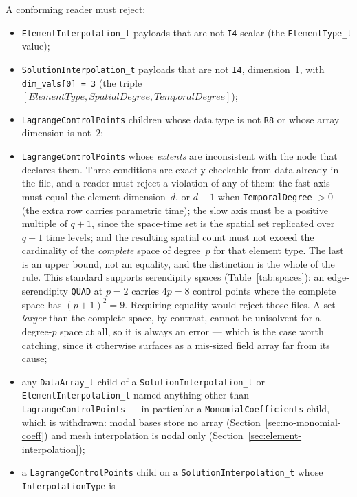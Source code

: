 \documentclass[11pt,letterpaper]{article}
\newif\ifvfourdraft
\newcommand{\vfour}[1]{\ifvfourdraft\textcolor{v4violet}{#1}\else#1\fi}
\begin{document}
A conforming reader must reject:
\begin{itemize}
  \item \texttt{ElementInterpolation\_t} payloads that are not \texttt{I4} scalar (the
    \texttt{ElementType\_t} value);
  \item \texttt{SolutionInterpolation\_t} payloads that are not \texttt{I4}, dimension~1, with
    \texttt{dim\_vals[0] = 3} (the triple
    $[\textit{ElementType}, \textit{SpatialDegree}, \textit{TemporalDegree}]$);
  \item \texttt{LagrangeControlPoints} children whose data type is not \texttt{R8} or whose
    array dimension is not~2;
  \item \vfour{\texttt{LagrangeControlPoints} whose \emph{extents} are inconsistent
    with the node that declares them.  Three conditions are exactly checkable from
    data already in the file, and a reader must reject a violation of any of them:
    the fast axis must equal the element dimension~$d$, or $d+1$ when
    \texttt{TemporalDegree} $>0$ (the extra row carries parametric time); the slow
    axis must be a positive multiple of $q+1$, since the space-time set is the
    spatial set replicated over $q+1$ time levels; and the resulting spatial count
    must not exceed the cardinality of the \emph{complete} space of degree~$p$ for
    that element type.
    The last is an upper bound, not an equality, and the distinction is the whole
    of the rule.  This standard supports serendipity spaces (Table~\ref{tab:spaces}):
    an edge-serendipity \texttt{QUAD} at $p=2$ carries $4p = 8$ control points where
    the complete space has $(p+1)^2 = 9$.  Requiring equality would reject those
    files.  A set \emph{larger} than the complete space, by contrast, cannot be
    unisolvent for a degree-$p$ space at all, so it is always an error --- which is
    the case worth catching, since it otherwise surfaces as a mis-sized field array
    far from its cause;}
  \item \vfour{any \texttt{DataArray\_t} child of a \texttt{SolutionInterpolation\_t}
    or \texttt{ElementInterpolation\_t} named anything other than
    \texttt{LagrangeControlPoints} --- in particular a \texttt{MonomialCoefficients}
    child, which is withdrawn: modal bases store no array
    (Section~\ref{sec:no-monomial-coeff}) and mesh interpolation is nodal only
    (Section~\ref{sec:element-interpolation});}
  \item \vfour{a \texttt{LagrangeControlPoints} child on a
    \texttt{SolutionInterpolation\_t} whose \texttt{InterpolationType} is
}
\end{itemize}
\end{document}
